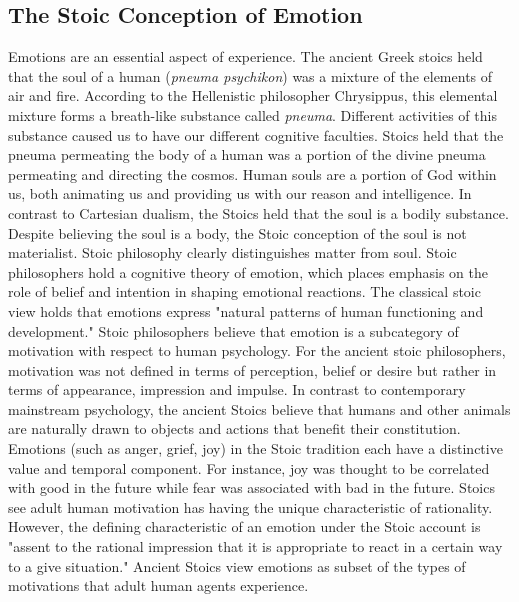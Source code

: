 \subsection{The Stoic Conception of Emotion }
	Emotions are an essential aspect of experience. The ancient Greek stoics held that the soul of a human (\textit{pneuma psychikon}) was a mixture of the elements of air and fire. According to the  Hellenistic philosopher Chrysippus,
this elemental mixture forms a breath-like substance called \textit{pneuma}.  Different activities of this substance caused us to have our different cognitive faculties. Stoics held that the pneuma permeating the body of a human  was a portion of the divine pneuma permeating and directing the cosmos. Human souls are a portion of God within us, both animating us and providing us with our reason and intelligence. In contrast to Cartesian dualism, the Stoics held that the soul is a bodily substance. Despite believing the soul is a body, the Stoic conception of the soul is not materialist. Stoic philosophy clearly distinguishes matter from soul. \cite{gould2012the} Stoic philosophers hold a cognitive theory of emotion, which places emphasis on the role of belief and intention in shaping emotional reactions. The classical stoic view holds that emotions express "natural patterns of human functioning and development." \cite{goldie2010the} Stoic philosophers believe that emotion is a subcategory of motivation with respect to human psychology. For the ancient stoic philosophers, motivation was not defined in terms of perception, belief or desire but rather in terms of appearance, impression and impulse. In contrast to contemporary mainstream psychology, the ancient Stoics believe that humans and other animals are naturally drawn to objects and actions that benefit their constitution. Emotions (such as anger, grief, joy) in the Stoic tradition each have a distinctive value and temporal component. For instance, joy was thought to be correlated with good in the future while fear was associated with bad in the future. Stoics see adult human motivation has having the unique characteristic of rationality. However, the defining characteristic of an emotion under the Stoic account is "assent to the rational impression that it is appropriate to react in a certain way to a give situation." \cite{goldie2010the}
Ancient Stoics view emotions as subset of the types of motivations that adult human agents experience.

